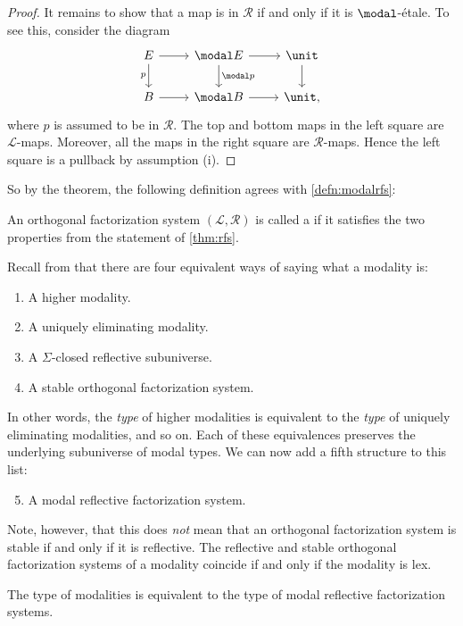 \documentclass{msc}
\begin{document}
\begin{proof}
  It remains to show that a map is in $\mathcal{R}$ if and only if it is $\modal$-\'etale. To see this, consider the diagram
  \begin{equation*}
    \begin{tikzcd}
      E \arrow[d,swap,"p"] \arrow[r] & \modal E \arrow[d,"\modal p"] \arrow[r] & \unit \arrow[d] \\
      B \arrow[r] & \modal B \arrow[r] & \unit,
    \end{tikzcd}
  \end{equation*}
  where $p$ is assumed to be in $\mathcal{R}$. The top and bottom maps in the left square are $\mathcal{L}$-maps. Moreover, all the maps in the right square are $\mathcal{R}$-maps. Hence the left square is a pullback by assumption (i).
\end{proof}
So by the theorem, the following definition agrees with \cref{defn:modalrfs}:
\begin{defn}
  An orthogonal factorization system $(\mathcal{L},\mathcal{R})$ is called a  if it satisfies the two properties from the statement of \cref{thm:rfs}.
\end{defn}
Recall from \cite[Section 1]{RijkeSpittersShulman} that there are four equivalent ways of saying what a modality is:
\begin{enumerate}
\item A higher modality.
\item A uniquely eliminating modality.
\item A $\Sigma$-closed reflective subuniverse.
\item A stable orthogonal factorization system.
\end{enumerate}
In other words, the \emph{type} of higher modalities is equivalent to the \emph{type} of uniquely eliminating modalities, and so on. Each of these equivalences preserves the underlying subuniverse of modal types. We can now add a fifth structure to this list:
\begin{enumerate}
  \setcounter{enumi}{4}
\item A modal reflective factorization system.
\end{enumerate}
Note, however, that this does \emph{not} mean that an orthogonal factorization system is stable if and only if it is reflective. The reflective and stable orthogonal factorization systems of a modality coincide if and only if the modality is lex.

\begin{thm}
  The type of modalities is equivalent to the type of modal reflective factorization systems.
\end{thm}
\end{document}
